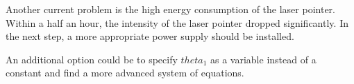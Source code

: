 \documentclass[./\jobname.tex]{subfiles}
\begin{document}
Another current problem is the high energy consumption of the laser pointer. Within a half an hour, the intensity of the laser pointer dropped significantly. In the next step, a more appropriate power supply should be installed.

An additional option could be to specify $theta_1$ as a variable instead of a constant and find a more advanced system of equations.   

\begin{figure}[H]
	\centering
	\noindent{}
	\label{fig:resting_offset}
\end{figure}
\end{document}
